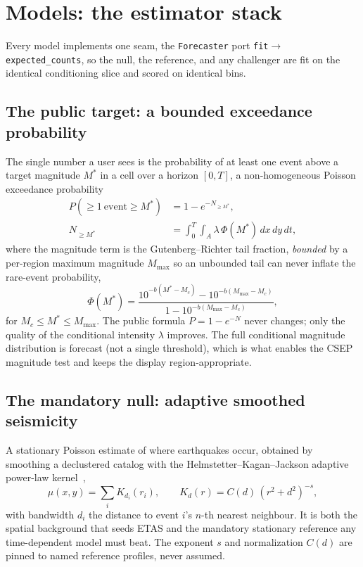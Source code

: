 \documentclass[journal]{IEEEtran}
\begin{document}
\section{Models: the estimator stack}
\label{sec:models}

Every model implements one seam, the \texttt{Forecaster} port
\texttt{fit}$\to$\texttt{expected\_counts}, so the null, the reference, and any challenger
are fit on the identical conditioning slice and scored on identical bins.

\subsection{The public target: a bounded exceedance probability}

The single number a user sees is the probability of at least one event above a target
magnitude $M^\ast$ in a cell over a horizon $[0,T]$, a non-homogeneous Poisson exceedance
probability
\begin{equation}
\begin{aligned}
P(\ge 1\ \text{event}\ge M^\ast) &= 1 - e^{-N_{\ge M^\ast}},\\
N_{\ge M^\ast} &= \int_0^T\!\!\!\int_A\!\lambda\,\Phi(M^\ast)\,dx\,dy\,dt,
\end{aligned}
\end{equation}
where the magnitude term is the Gutenberg--Richter tail fraction, \emph{bounded} by a
per-region maximum magnitude $M_{\max}$ so an unbounded tail can never inflate the
rare-event probability,
\begin{equation}
\Phi(M^\ast)=\frac{10^{-b(M^\ast-M_c)}-10^{-b(M_{\max}-M_c)}}{1-10^{-b(M_{\max}-M_c)}},
\end{equation}
for $M_c\le M^\ast\le M_{\max}$. The public formula $P=1-e^{-N}$ never changes; only the quality of the conditional
intensity $\lambda$ improves. The full conditional magnitude distribution is forecast (not
a single threshold), which is what enables the CSEP magnitude test and keeps the display
region-appropriate.

\subsection{The mandatory null: adaptive smoothed seismicity}

A stationary Poisson estimate of where earthquakes occur, obtained by smoothing a
declustered catalog with the Helmstetter--Kagan--Jackson adaptive power-law
kernel~\cite{helmstetter2007},
\begin{equation}
\mu(x,y)=\sum_i K_{d_i}(r_i),\qquad K_d(r)=C(d)\,(r^2+d^2)^{-s},
\end{equation}
with bandwidth $d_i$ the distance to event $i$'s $n$-th nearest neighbour. It is both the
spatial background that seeds ETAS and the mandatory stationary reference any
time-dependent model must beat. The exponent $s$ and normalization $C(d)$ are pinned to
named reference profiles, never assumed.
\end{document}
